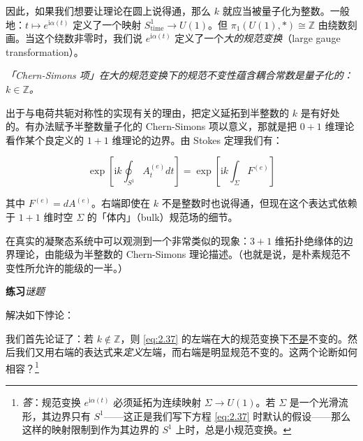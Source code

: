 因此，如果我们想要让理论在圆上说得通，那么 $k$ 就应当被量子化为整数。一般地：$t\mapsto e^{\mathrm{i}\alpha(t)}$ 定义了一个映射 $S^{1}_{\mathrm{time}}\to U(1)$。但 $\pi_1(U(1),*)\cong\mathbb{Z}$ 由绕数刻画。当这个绕数非零时，我们说 $e^{\mathrm{i}\alpha(t)}$ 定义了一个\emph{大的规范变换}（large gauge transformation）。

{\itshape「Chern-Simons 项」在大的规范变换下的规范不变性蕴含耦合常数是量子化的：$k\in\mathbb{Z}$。\par}

出于与电荷共轭对称性的实现有关的理由，把定义延拓到半整数的 $k$ 是有好处的。有办法赋予半整数量子化的 Chern-Simons 项以意义，那就是把 $0+1$ 维理论看作某个良定义的 $1+1$ 维理论的边界。由 Stokes 定理我们有：

\begin{equation}
  \exp\left[\mathrm{i}k\oint_{S^{1}}A_t^{(e)}dt\right]=\exp\left[\mathrm{i}k\int_{\Sigma}F^{(e)}\right]
  \tag{2.37}
  \label{eq:2.37}
\end{equation}

其中 $F^{(e)}=dA^{(e)}$。右端即使在 $k$ 不是整数时也说得通，但现在这个表达式依赖于 $1+1$ 维时空 $\Sigma$ 的「体内」（bulk）规范场的细节。

在真实的凝聚态系统中可以观测到一个非常类似的现象：$3+1$ 维拓扑绝缘体的边界理论，由能级为半整数的 Chern-Simons 理论描述。（也就是说，是朴素规范不变性所允许的能级的一半。）

\medskip\noindent\textbf{练习}\quad\emph{谜题}

解决如下悖论：

我们首先论证了：若 $k\notin\mathbb{Z}$，则 \eqref{eq:2.37} 的左端在大的规范变换下\underline{不是}不变的。然后我们又用右端的表达式来\emph{定义}左端，而右端是明显规范不变的。这两个论断如何相容？\footnote{\emph{答}：规范变换 $e^{\mathrm{i}\alpha(t)}$ 必须延拓为连续映射 $\Sigma\to U(1)$。若 $\Sigma$ 是一个光滑流形，其边界只有 $S^{1}$——这正是我们写下方程 \eqref{eq:2.37} 时默认的假设——那么这样的映射限制到作为其边界的 $S^{1}$ 上时，总是小规范变换。}


